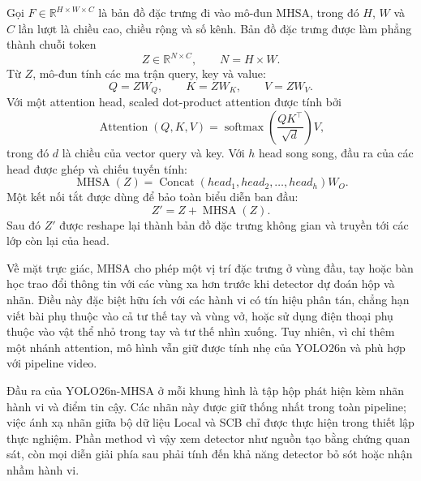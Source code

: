 Gọi \(F\in\mathbb{R}^{H\times W\times C}\) là bản đồ đặc trưng đi vào mô-đun MHSA, trong đó \(H\), \(W\) và \(C\) lần lượt là chiều cao, chiều rộng và số kênh. Bản đồ đặc trưng được làm phẳng thành chuỗi token
\begin{equation}
\label{eq:mhsa-flattened-features}
    Z\in\mathbb{R}^{N\times C}, \qquad N=H\times W.
\end{equation}
Từ \(Z\), mô-đun tính các ma trận query, key và value:
\begin{equation}
\label{eq:mhsa-projections}
    Q=ZW_Q, \qquad K=ZW_K, \qquad V=ZW_V.
\end{equation}
Với một attention head, scaled dot-product attention được tính bởi
\begin{equation}
\label{eq:scaled-dot-product-attention}
    \operatorname{Attention}(Q,K,V)=\operatorname{softmax}\left(\frac{QK^\top}{\sqrt{d}}\right)V,
\end{equation}
trong đó \(d\) là chiều của vector query và key. Với \(h\) head song song, đầu ra của các head được ghép và chiếu tuyến tính:
\begin{equation}
\label{eq:mhsa-output}
    \operatorname{MHSA}(Z)=\operatorname{Concat}(head_1,head_2,\ldots,head_h)W_O.
\end{equation}
Một kết nối tắt được dùng để bảo toàn biểu diễn ban đầu:
\begin{equation}
\label{eq:mhsa-residual}
    Z' = Z + \operatorname{MHSA}(Z).
\end{equation}
Sau đó \(Z'\) được reshape lại thành bản đồ đặc trưng không gian và truyền tới các lớp còn lại của head.

Về mặt trực giác, MHSA cho phép một vị trí đặc trưng ở vùng đầu, tay hoặc bàn học trao đổi thông tin với các vùng xa hơn trước khi detector dự đoán hộp và nhãn. Điều này đặc biệt hữu ích với các hành vi có tín hiệu phân tán, chẳng hạn viết bài phụ thuộc vào cả tư thế tay và vùng vở, hoặc sử dụng điện thoại phụ thuộc vào vật thể nhỏ trong tay và tư thế nhìn xuống. Tuy nhiên, vì chỉ thêm một nhánh attention, mô hình vẫn giữ được tính nhẹ của YOLO26n và phù hợp với pipeline video.

Đầu ra của YOLO26n-MHSA ở mỗi khung hình là tập hộp phát hiện kèm nhãn hành vi và điểm tin cậy. Các nhãn này được giữ thống nhất trong toàn pipeline; việc ánh xạ nhãn giữa bộ dữ liệu Local và SCB chỉ được thực hiện trong thiết lập thực nghiệm. Phần method vì vậy xem detector như nguồn tạo bằng chứng quan sát, còn mọi diễn giải phía sau phải tính đến khả năng detector bỏ sót hoặc nhận nhầm hành vi.